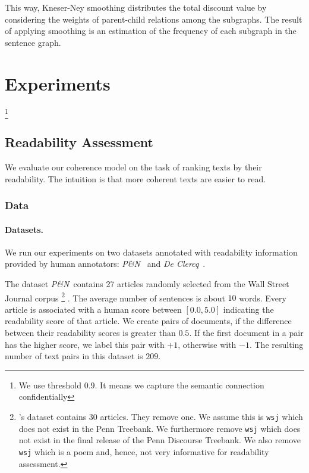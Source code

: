 This way, Kneser-Ney smoothing distributes the total discount value by
considering the weights of parent-child relations among the
subgraphs. The result of applying smoothing is an estimation of the
frequency of each subgraph in the sentence graph.



\section{Experiments}
\label{sec:experiments}

\footnote{We use threshold $0.9$. It means we capture the semantic connection confidentially}


\subsection{Readability Assessment}
\label{subsec:readability_assessment}
We evaluate our coherence model on the task of ranking texts by their
readability. The intuition is that more coherent texts are easier to
read. 


\subsubsection{Data}
\paragraph{Datasets.} We run our experiments on two datasets annotated
with readability information provided by human annotators: \emph{P\&N}\
\cite{pitler08} and \emph{De Clercq}\ \cite{declercq14}.

The dataset \emph{P\&N}\ contains 27 articles randomly selected from
the Wall Street Journal corpus%
%
\footnote{'s dataset contains 30 articles. They
  remove one. We assume this is \texttt{wsj\--0382} which
does not exist in the Penn Treebank. We furthermore remove
\texttt{wsj} which does not exist in the final release of the
Penn Discourse Treebank. We also remove \texttt{wsj\--1398} which is a
poem and, hence, not very informative for readability assessment.}%
%
. The average number of sentences is about $10$ words. Every article is
associated with a human score between $[0.0,5.0]$ indicating the
readability score of that article. We create pairs of documents, if
the difference between their readability scores is greater than
$0.5$. If the first document in a pair has the higher score, we label
this pair with $+1$, otherwise with $-1$. The resulting number of text pairs in
this dataset is $209$.

